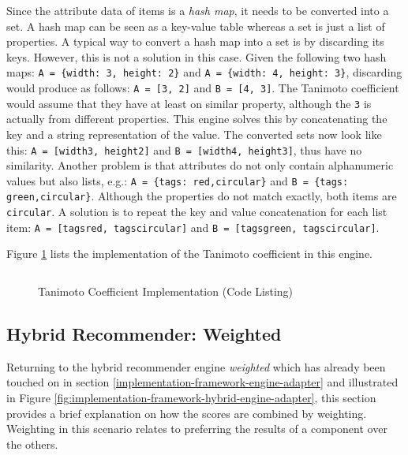 Since the attribute data of items is a \emph{hash map}, it needs to be converted into a set. A hash map can be seen as a key-value table whereas a set is just a list of properties. A typical way to convert a hash map into a set is by discarding its keys. However, this is not a solution in this case. Given the following two hash maps: \texttt{A = \{width: 3, height: 2\}} and \texttt{A = \{width: 4, height: 3\}}, discarding would produce as follows: \texttt{A = [3, 2]} and \texttt{B = [4, 3]}. The Tanimoto coefficient would assume that they have at least on similar property, although the \texttt{3} is actually from different properties. This engine solves this by concatenating the key and a string representation of the value. The converted sets now look like this: \texttt{A = [width3, height2]} and \texttt{B = [width4, height3]}, thus have no similarity. Another problem is that attributes do not only contain alphanumeric values but also lists, e.g.: \texttt{A = \{tags: red,circular\}} and \texttt{B = \{tags: green,circular\}}. Although the properties do not match exactly, both items are \texttt{circular}. A solution is to repeat the key and value concatenation for each list item: \texttt{A = [tagsred, tagscircular]} and \texttt{B = [tagsgreen, tagscircular]}.

Figure \ref{fig:implementation-itemsimilarity-tanimotocode} lists the implementation of the Tanimoto coefficient in this engine.

\begin{figure}[!ht]
    \inputminted{php}{./includes/source/engines/itemSimilarity/src/Koklu/Model/Similarity/TanimotoCoefficient.php}
    \caption{Tanimoto Coefficient Implementation (Code Listing)}
    \label{fig:implementation-itemsimilarity-tanimotocode}
\end{figure}

\subsection{Hybrid Recommender: Weighted}

Returning to the hybrid recommender engine \emph{weighted} which has already been touched on in section \ref{implementation-framework-engine-adapter} and illustrated in Figure \ref{fig:implementation-framework-hybrid-engine-adapter}, this section provides a brief explanation on how the scores are combined by weighting. Weighting in this scenario relates to preferring the results of a  component over the others.

